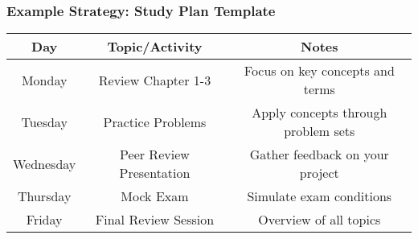 \documentclass{beamer}
\begin{document}
\begin{frame}[fragile]
    \frametitle{Example Strategy: Study Plan Template}
    \begin{tabular}{|c|c|c|}
        \hline
        Day & Topic/Activity & Notes \\
        \hline
        Monday & Review Chapter 1-3 & Focus on key concepts and terms \\
        Tuesday & Practice Problems & Apply concepts through problem sets \\
        Wednesday & Peer Review Presentation & Gather feedback on your project \\
        Thursday & Mock Exam & Simulate exam conditions \\
        Friday & Final Review Session & Overview of all topics \\
        \hline
    \end{tabular}
\end{frame}
\end{document}
